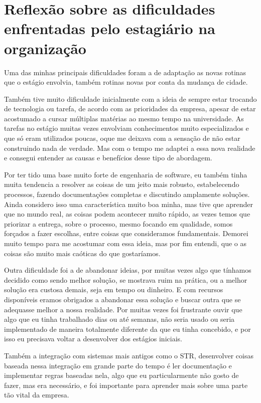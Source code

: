 \documentclass{ufscar}
\begin{document}
\section{Reflexão sobre as dificuldades enfrentadas pelo estagiário na organização}

Uma das minhas principais dificuldades foram a de adaptação as novas rotinas que o estágio envolvia, também rotinas novas por conta da mudança de cidade.

Também tive muito dificuldade inicialmente com a ideia de sempre estar trocando de tecnologia ou tarefa, de acordo com as prioridades da empresa, apesar de estar acostumado a cursar múltiplas matérias ao mesmo tempo na universidade. As tarefas no estágio muitas vezes envolviam conhecimentos muito especializados e que só eram utilizados poucas, oque me deixava com a sensação de não estar construindo nada de verdade. Mas com o tempo me adaptei a essa nova realidade e consegui entender as causas e benefícios desse tipo de abordagem.

Por ter tido uma base muito forte de engenharia de software, eu também tinha muita tendencia a resolver as coisas de um jeito mais robusto, estabelecendo processos, fazendo documentações completas e discutindo amplamente soluções. Ainda considero isso uma característica muito boa minha, mas tive que aprender que no mundo real, as coisas podem acontecer muito rápido, as vezes temos que priorizar a entrega, sobre o processo, mesmo focando em qualidade, somos forçados a fazer escolhas, entre coisas que consideramos fundamentais. Demorei muito tempo para me acostumar com essa ideia, mas por fim entendi, que o as coisas são muito mais caóticas do que gostaríamos.

Outra dificuldade foi a de abandonar ideias, por muitas vezes algo que tínhamos decidido como sendo melhor solução, se mostrava ruim na prática, ou a melhor solução era custosa demais, seja em tempo ou dinheiro. E com recursos disponíveis eramos obrigados a abandonar essa solução e buscar outra que se adequasse melhor a nossa realidade. Por muitas vezes foi frustrante ouvir que algo que eu tinha trabalhado dias ou até semanas, não seria usado ou seria implementado de maneira totalmente diferente da que eu tinha concebido, e por isso eu precisava voltar a desenvolver dos estágios iniciais.

Também a integração com sistemas mais antigos como o STR, desenvolver coisas baseada nessa integração em grande parte do tempo é ler documentação e implementar regras baseadas nela, algo que eu particularmente não gosto de fazer, mas era necessário, e foi importante para aprender mais sobre uma parte tão vital da empresa.
\end{document}

